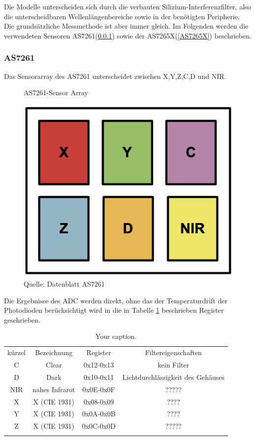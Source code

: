 \noindent Die Modelle unterscheiden sich durch die verbauten Silizium-Interferenzfilter, also die unterscheidbaren Wellenlängenbereiche sowie in der benötigten Peripherie.
Die grundsätzliche Messmethode ist aber immer gleich.
Im Folgenden werden die verwendeten Sensoren AS7261(\ref{AS7261}) sowie der AS7265X(\ref{AS7265X}) beschrieben.


\subsubsection{AS7261}\label{AS7261}
Das Sensorarray des AS7261 unterscheidet zwischen X,Y,Z,C,D und NIR.
\begin{figure}[H]
  \centering
    \caption{AS7261-Sensor Array}
 \includegraphics[width=0.4\linewidth]{img/AS7261-Sensor_Array.png}
  \caption*{Quelle: Datenblatt AS7261}
  \label{fig:AS7261-Sensor_Array}
\end{figure}

\noindent Die Ergebnisse des ADC werden direkt, ohne das der Temperaturdrift der Photodioden berücksichtigt wird in die in Tabelle \ref{RAW_Values_AS7261} beschrieben Register geschrieben.


\begin{table}[!ht]
\caption{Your caption.}
\centering
\begin{tabular}{ c c c c}
 kürzel & Bezeichnung & Register & Filtereigenschaften\\
 C & Clear &0x12-0x13& kein Filter \\ 
 D & Dark &0x10-0x11& Lichtdurchlässigkeit des Gehäuses \\  
 NIR & nahes Infrarot &0x0E-0x0F & ????? \\  
 X & X (CIE 1931) & 0x08-0x09 & ????\\
 Y & X (CIE 1931) & 0x0A-0x0B & ????\\  
 Z & X (CIE 1931) & 0x0C-0x0D & ?????\\
\label{RAW_Values_AS7261}
\end{tabular}
\end{table}

